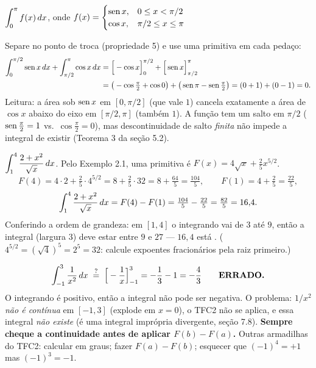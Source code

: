 \begin{exemplo}
$\displaystyle\int_0^{\pi}f(x)\,dx$, onde $f(x)=\begin{cases}\operatorname{sen} x,&0\le x<\pi/2\\ \cos x,&\pi/2\le x\le\pi\end{cases}$

Separe no ponto de troca (propriedade 5) e use uma primitiva em cada pedaço:
\begin{align*}
\int_0^{\pi/2}\operatorname{sen} x\,dx+\int_{\pi/2}^{\pi}\cos x\,dx
&=\Big[-\cos x\Big]_0^{\pi/2}+\Big[\operatorname{sen} x\Big]_{\pi/2}^{\pi}\\
&=\big(-\cos\tfrac\pi2+\cos0\big)+\big(\operatorname{sen}\pi-\operatorname{sen}\tfrac\pi2\big)
=(0+1)+(0-1)=0.
\end{align*}
Leitura: a área sob $\operatorname{sen} x$ em $[0,\pi/2]$ (que vale $1$) cancela exatamente a área de $\cos x$ abaixo do eixo em $[\pi/2,\pi]$ (também $1$). A função tem um salto em $\pi/2$ ($\operatorname{sen}\frac\pi2=1$ vs.\ $\cos\frac\pi2=0$), mas descontinuidade de salto \emph{finita} não impede a integral de existir (Teorema 3 da seção 5.2).
\end{exemplo}

\begin{exemplo}
$\displaystyle\int_1^4\frac{2+x^2}{\sqrt x}\,dx$. Pelo Exemplo 2.1, uma primitiva é $F(x)=4\sqrt x+\tfrac25x^{5/2}$.
\[
F(4)=4\cdot2+\tfrac25\cdot4^{5/2}=8+\tfrac25\cdot32=8+\tfrac{64}{5}=\tfrac{104}{5},\qquad
F(1)=4+\tfrac25=\tfrac{22}{5},
\]
\[
\int_1^4\frac{2+x^2}{\sqrt x}\,dx=F(4)-F(1)=\tfrac{104}{5}-\tfrac{22}{5}=\tfrac{82}{5}=16{,}4 .
\]
Conferindo a ordem de grandeza: em $[1,4]$ o integrando vai de $3$ até $9$, então a integral (largura $3$) deve estar entre $9$ e $27$ --- $16{,}4$ está \ok. ($4^{5/2}=(\sqrt4)^5=2^5=32$: calcule expoentes fracionários pela raiz primeiro.)
\end{exemplo}

\begin{armadilha}
\[
\int_{-1}^{3}\frac{1}{x^2}\,dx\;\overset{?}{=}\;\Big[-\frac1x\Big]_{-1}^{3}=-\frac13-1=-\frac43 \qquad\textbf{ERRADO.}
\]
O integrando é positivo, então a integral não pode ser negativa. O problema: $1/x^2$ \emph{não é contínua} em $[-1,3]$ (explode em $x=0$), o TFC2 não se aplica, e essa integral \emph{não existe} (é uma integral imprópria divergente, seção 7.8). \textbf{Sempre cheque a continuidade antes de aplicar $F(b)-F(a)$.} Outras armadilhas do TFC2: calcular em graus; fazer $F(a)-F(b)$; esquecer que $(-1)^4=+1$ mas $(-1)^3=-1$.
\end{armadilha}

